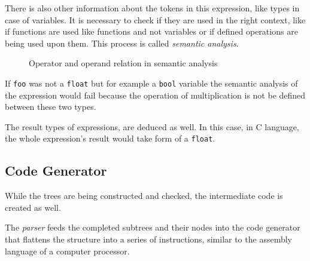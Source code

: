             There is also other information about the tokens in this expression, like types in case of variables. It is necessary to check if they are used in the right context, like if functions are used like functions and not variables or if defined operations are being used upon them. This process is called \emph{semantic analysis}.\cite{DragonBook}

            \begin{figure}[H]
            \centering
            \caption{Operator and operand relation in semantic analysis} \label{fig:semantic}
            \end{figure}

            If \texttt{foo} was not a \texttt{float} but for example a \texttt{bool} variable the semantic analysis of the expression would fail because the operation of multiplication is not be defined between these two types.

            The result types of expressions, are deduced as well. In this case, in C language, the whole expression's result would take form of a \texttt{float}.

        \subsection{Code Generator}

            While the trees are being constructed and checked, the intermediate code is created as well.

            The \emph{parser} feeds the completed subtrees and their nodes into the code generator that flattens the structure into a series of instructions, similar to the assembly language of a computer processor.\cite{DragonBook}

